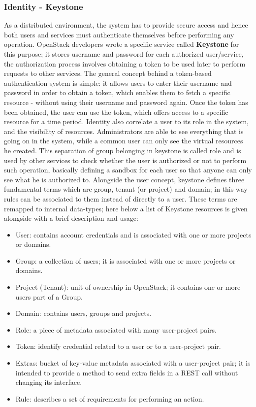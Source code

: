 \subsubsection{Identity - Keystone}
\label{sec:keystone}
As a distributed environment, the system has to provide secure access and hence both users and services must authenticate themselves before performing any operation.
OpenStack developers wrote a specific service called \textbf{Keystone} for this purpose; it stores username and password for each authorized user/service, the authorization process involves obtaining a token to be used later to perform requests to other services. The general concept behind a token-based authentication system is simple: it allows users to enter their username and password in order to obtain a token, which enables them to fetch a specific resource - without using their username and password again. Once the token has been obtained, the user can use the token, which offers access to a specific resource for a time period. Identity also correlate a user to its role in the system, and the visibility of resources. Administrators are able to see everything that is going on in the system, while a common user can only see the virtual resources he created.
This separation of group belonging in keystone is called role and is used by other services to check whether the user is authorized or not to perform such operation, basically defining a sandbox for each user so that anyone can only see what he is authorized to.
Alongside the user concept, keystone defines three fundamental terms which are group, tenant (or project) and domain; in this way rules can be associated to them instead of directly to a user. These terms are remapped to internal data-types; here below a list of Keystone resources is given alongside with a brief description and usage:
\begin{itemize}
	\item User: contains account credentials and is associated with one or more projects or domains.
	\item Group: a collection of users; it is associated with one or more projects or domains.
	\item Project (Tenant): unit of ownership in OpenStack; it contains one or more users part of a Group.
	\item Domain: contains users, groups and projects.
	\item Role: a piece of metadata associated with many user-project pairs.
	\item Token: identify credential related to a user or to a user-project pair.
	\item Extras: bucket of key-value metadata associated with a user-project pair; it is intended to provide a method to send extra fields in a REST call without changing its interface.
	\item Rule: describes a set of requirements for performing an action.
\end{itemize}
